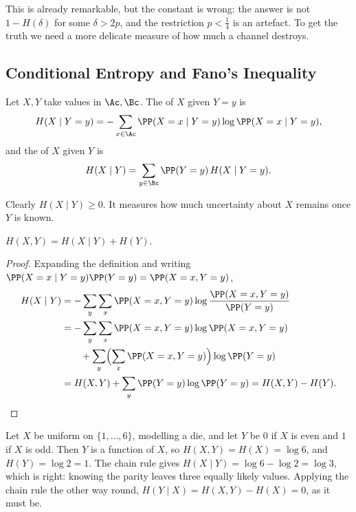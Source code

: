 This is already remarkable, but the constant is wrong: the answer is not $1-H(\delta)$ for some $\delta > 2p$, and the restriction $p< \tfrac14$ is an artefact. To get the truth we need a more delicate measure of how much a channel destroys.

\subsection{Conditional Entropy and Fano's Inequality}

\begin{definition}
	Let $X, Y$ take values in $\Ac, \Bc$. The  of $X$ given $Y = y$ is
	$$H(X \mid Y=y) = -\sum_{x \in \Ac}\PP(X = x\mid Y=y)\log\PP(X=x\mid Y=y),$$
	and the  of $X$ given $Y$ is
	$$H(X\mid Y) = \sum_{y\in\Bc}\PP(Y=y)\,H(X\mid Y=y).$$
\end{definition}

Clearly $H(X\mid Y)\ge0$. It measures how much uncertainty about $X$ remains once $Y$ is known.

\begin{lemma}\label{lem:chain}
	$H(X,Y) = H(X\mid Y) + H(Y)$.
\end{lemma}

\begin{proof}
	Expanding the definition and writing $\PP(X = x \mid Y = y)\PP(Y=y) = \PP(X=x,Y=y)$,
	\begin{align*}
		H(X\mid Y) &= -\sum_{y}\sum_x \PP(X=x,Y=y)\log\frac{\PP(X=x,Y=y)}{\PP(Y=y)}\\
		&= -\sum_{y}\sum_x \PP(X=x,Y=y)\log\PP(X=x,Y=y)\\
		&\qquad + \sum_y \Bigl(\sum_x\PP(X=x,Y=y)\Bigr)\log\PP(Y=y)\\
		&= H(X,Y) + \sum_y \PP(Y=y)\log\PP(Y=y) = H(X,Y)-H(Y). \qedhere
	\end{align*}
\end{proof}

\begin{example}
	Let $X$ be uniform on $\{1,\dots,6\}$, modelling a die, and let $Y$ be $0$ if $X$ is even and $1$ if $X$ is odd. Then $Y$ is a function of $X$, so $H(X,Y)=H(X)=\log 6$, and $H(Y)=\log2 = 1$. The chain rule gives $H(X\mid Y) = \log 6 - \log 2 = \log 3$, which is right: knowing the parity leaves three equally likely values. Applying the chain rule the other way round, $H(Y\mid X) = H(X,Y)-H(X) = 0$, as it must be.
\end{example}

